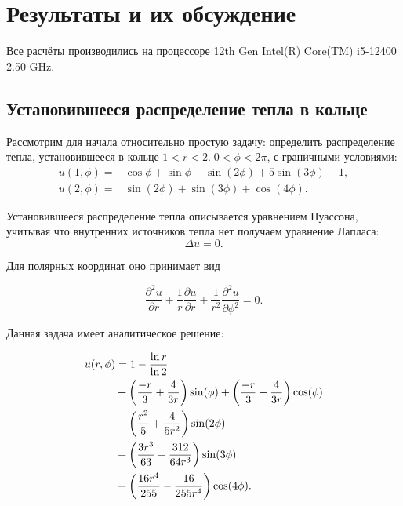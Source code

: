 \documentclass[a4paper,14pt]{extarticle} %
\begin{document}



\FloatBarrier
\section{Результаты и их обсуждение}

Все расчёты производились на процессоре 12th Gen Intel(R) Core(TM) i5-12400 2.50 GHz.

\subsection{Установившееся распределение тепла в кольце}

Рассмотрим для начала относительно простую задачу: определить распределение тепла, установившееся в кольце $1<r<2.\; 0<\phi<2\pi$, с граничными условиями:
\begin{equation}
    \begin{aligned}
        u(1,\phi)= & \cos\phi+\sin\phi+\sin(2\phi)+5\sin(3\phi)+1, \\
        u(2,\phi)= & \sin(2\phi)+\sin(3\phi)+\cos(4\phi).
    \end{aligned}
\end{equation}

Установившееся распределение тепла описывается уравнением Пуассона, учитывая что внутренних источников тепла нет получаем уравнение Лапласа:
\begin{equation}
    \Delta u = 0.
\end{equation}

Для полярных координат оно принимает вид

\begin{equation}
    \frac{\partial^2 u}{\partial r} + \frac{1}{r} \frac{\partial u}{\partial r} + \frac{1}{r^2}\frac{\partial^2 u}{\partial \phi^2} = 0.
\end{equation}

Данная задача имеет аналитическое решение:

\begin{equation}\label{eq:termal}
    \begin{split}
        u(r,\phi) & = 1-\frac{\ln r}{\ln 2}\\
        &+{\left( \frac{-r}{3}+\frac{4}{3r} \right)}\sin(\phi)+{\left( \frac{-r}{3}+\frac{4}{3r} \right)}\cos(\phi)\\
        &+{\left( \frac{r^2}{5}+\frac{4}{5r^2} \right)}\sin(2\phi)\\
        &+{\left( \frac{3r^3}{63}+\frac{312}{64r^3} \right)}\sin(3\phi)\\
        &+{\left( \frac{16r^4}{255}-\frac{16}{255r^4} \right)}\cos(4\phi).
    \end{split}
\end{equation}
\end{document}
